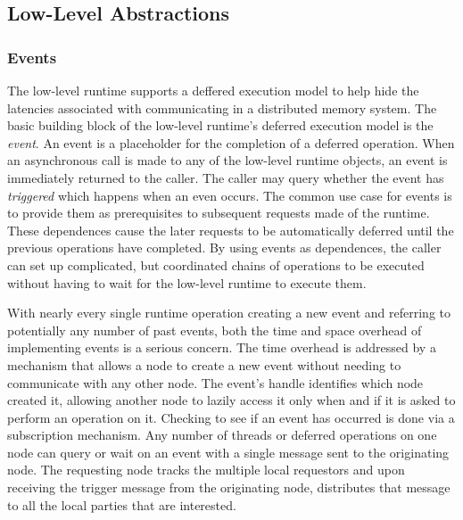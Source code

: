 \subsection{Low-Level Abstractions}
\label{subsec:lowobjects}
\subsubsection{Events}
\label{subsec:events}
The low-level runtime supports a deffered execution model to help hide
the latencies associated with communicating in a distributed memory
system.  The basic building block of the low-level runtime's deferred execution model
is the {\em event}.  An event is a placeholder for the completion of a deferred
operation.  When an asynchronous call is made to any of the low-level runtime objects, an event is 
immediately returned to the caller.  The caller may query whether the event has {\em triggered}
which happens when an even occurs.  The common use case for events is
to provide them as prerequisites to subsequent requests made of the runtime. 
These dependences cause the later requests to be automatically deferred until the previous
operations have completed.  By using events as dependences, the caller can
set up complicated, but coordinated chains of operations to be executed without
having to wait for the low-level runtime to execute them.

With nearly every single runtime operation creating a new event and referring
to potentially any number of past events, both the time and space overhead of
implementing events is a serious concern.  The time overhead is addressed by a
mechanism that allows a node to create a new event without needing to
communicate with any other node.  The event's handle identifies which node
created it, allowing another node to lazily access it only when and if it 
is asked to perform an operation on it.  Checking to see if an event has
occurred is done via a subscription mechanism.  Any number of threads or
deferred operations on one node can query or wait on an event with a single
message sent to the originating node.  The requesting node tracks the multiple
local requestors and upon receiving the trigger message from the originating
node, distributes that message to all the local parties that are interested.

